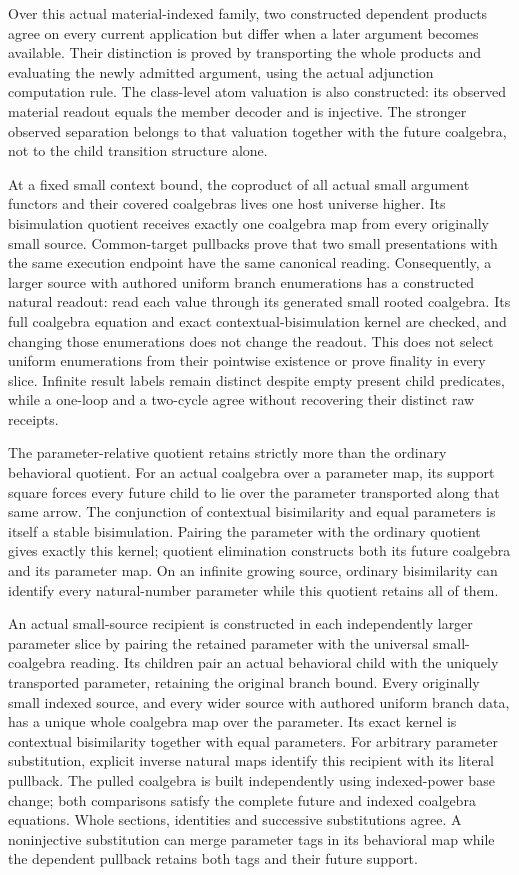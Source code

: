 \documentclass[11pt]{article}
\theoremstyle{definition}
\theoremstyle{remark}
\begin{document}
Over this actual material-indexed family, two constructed dependent
products agree on every current application but differ when a later
argument becomes available.  Their distinction is proved by transporting
the whole products and evaluating the newly admitted argument, using the
actual adjunction computation rule.  The class-level atom valuation is
also constructed: its observed material readout equals the member decoder
and is injective.  The stronger observed separation belongs to that
valuation together with the future coalgebra, not to the child transition
structure alone.

At a fixed small context bound, the coproduct of all actual small
argument functors and their covered coalgebras lives one host universe
higher.  Its bisimulation quotient receives exactly one coalgebra map
from every originally small source.  Common-target pullbacks prove
that two small presentations with the same execution endpoint have the
same canonical reading.  Consequently, a larger source with authored
uniform branch enumerations has a constructed natural readout: read
each value through its generated small rooted coalgebra.  Its full
coalgebra equation and exact contextual-bisimulation kernel are checked,
and changing those enumerations does not change the readout.  This
does not select uniform enumerations from their pointwise existence or
prove finality in every slice.  Infinite result labels remain distinct
despite empty present child predicates, while a one-loop and a two-cycle
agree without recovering their distinct raw receipts.

The parameter-relative quotient retains strictly more than the ordinary
behavioral quotient.  For an actual coalgebra over a parameter map, its
support square forces every future child to lie over the parameter
transported along that same arrow.  The conjunction of contextual
bisimilarity and equal parameters is itself a stable bisimulation.  Pairing
the parameter with the ordinary quotient gives exactly this kernel;
quotient elimination constructs both its future coalgebra and its parameter
map.  On an infinite growing source, ordinary bisimilarity can identify
every natural-number parameter while this quotient retains all of them.

An actual small-source recipient is constructed in each independently
larger parameter slice by pairing the retained parameter with the universal
small-coalgebra reading.  Its children pair an actual behavioral child with
the uniquely transported parameter, retaining the original branch bound.
Every originally small indexed source, and every wider source with authored
uniform branch data, has a unique whole coalgebra map over the parameter.
Its exact kernel is contextual bisimilarity together with equal parameters.
For arbitrary parameter substitution, explicit inverse natural maps identify
this recipient with its literal pullback.  The pulled coalgebra is built
independently using indexed-power base change; both comparisons satisfy the
complete future and indexed coalgebra equations.  Whole sections, identities
and successive substitutions agree.  A noninjective substitution can merge
parameter tags in its behavioral map while the dependent pullback retains
both tags and their future support.
\end{document}
